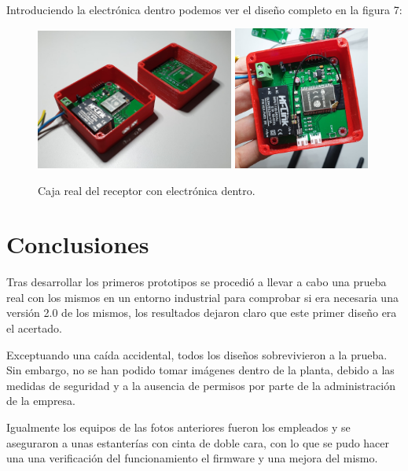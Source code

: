 \documentclass[paper=a4, fontsize=11pt,twoside]{scrartcl}
\begin{document}
        \paragraph{}
        Introduciendo la electrónica dentro podemos ver el diseño completo en la figura 7:
        \begin{center}
            \begin{figure}[h]
                \centering
                \includegraphics[width=0.58\textwidth]{../3d_master_2_box.jpeg}
                \includegraphics[width=0.4\textwidth]{../3d_antenna.jpeg}
                \caption{Caja real del receptor con electrónica dentro.}
                \label{fig:mesh1}
            \end{figure}    
        \end{center}
\section{Conclusiones}
    Tras desarrollar los primeros prototipos se procedió a llevar a cabo una prueba real con los mismos 
    en un entorno industrial para comprobar si era necesaria una versión 2.0 de los mismos, los resultados
    dejaron claro que este primer diseño era el acertado.

    Exceptuando una caída accidental, todos los diseños sobrevivieron a la prueba. Sin embargo, no se
    han podido tomar imágenes dentro de la planta, debido a las medidas de seguridad y a la ausencia
    de permisos por parte de la administración de la empresa.

    Igualmente los equipos de las fotos anteriores fueron los empleados y se aseguraron a unas estanterías con cinta de doble
    cara, con lo que se pudo hacer una una verificación del funcionamiento el firmware y una mejora del mismo.
\end{document}
